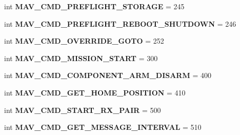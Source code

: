 \begin{DoxyCompactItemize}
\mbox{\label{namespacepymavlink_1_1dialects_1_1v10_a145c3e61dc4dabe3a4db04d59536075a}} 
int {\bfseries M\+A\+V\+\_\+\+C\+M\+D\+\_\+\+P\+R\+E\+F\+L\+I\+G\+H\+T\+\_\+\+S\+T\+O\+R\+A\+GE} = 245
\item 
\mbox{\label{namespacepymavlink_1_1dialects_1_1v10_a61969a3231fe31055027de86675eba91}} 
int {\bfseries M\+A\+V\+\_\+\+C\+M\+D\+\_\+\+P\+R\+E\+F\+L\+I\+G\+H\+T\+\_\+\+R\+E\+B\+O\+O\+T\+\_\+\+S\+H\+U\+T\+D\+O\+WN} = 246
\item 
\mbox{\label{namespacepymavlink_1_1dialects_1_1v10_a219fc35f5a3f0f54a034aa26926eab86}} 
int {\bfseries M\+A\+V\+\_\+\+C\+M\+D\+\_\+\+O\+V\+E\+R\+R\+I\+D\+E\+\_\+\+G\+O\+TO} = 252
\item 
\mbox{\label{namespacepymavlink_1_1dialects_1_1v10_a67c4fd3d820ccb5bc9ab9e41e5db7a70}} 
int {\bfseries M\+A\+V\+\_\+\+C\+M\+D\+\_\+\+M\+I\+S\+S\+I\+O\+N\+\_\+\+S\+T\+A\+RT} = 300
\item 
\mbox{\label{namespacepymavlink_1_1dialects_1_1v10_aa1a353ca26d6eb7979c2c8741b7ea07e}} 
int {\bfseries M\+A\+V\+\_\+\+C\+M\+D\+\_\+\+C\+O\+M\+P\+O\+N\+E\+N\+T\+\_\+\+A\+R\+M\+\_\+\+D\+I\+S\+A\+RM} = 400
\item 
\mbox{\label{namespacepymavlink_1_1dialects_1_1v10_ad236b48762a8d64bccb7b69349e08936}} 
int {\bfseries M\+A\+V\+\_\+\+C\+M\+D\+\_\+\+G\+E\+T\+\_\+\+H\+O\+M\+E\+\_\+\+P\+O\+S\+I\+T\+I\+ON} = 410
\item 
\mbox{\label{namespacepymavlink_1_1dialects_1_1v10_ab054293df9f12a2d801a9b7f7852d68d}} 
int {\bfseries M\+A\+V\+\_\+\+C\+M\+D\+\_\+\+S\+T\+A\+R\+T\+\_\+\+R\+X\+\_\+\+P\+A\+IR} = 500
\item 
\mbox{\label{namespacepymavlink_1_1dialects_1_1v10_a714394896fc26fcedc8660d89d9cc414}} 
int {\bfseries M\+A\+V\+\_\+\+C\+M\+D\+\_\+\+G\+E\+T\+\_\+\+M\+E\+S\+S\+A\+G\+E\+\_\+\+I\+N\+T\+E\+R\+V\+AL} = 510
\item 

\end{DoxyCompactItemize}
